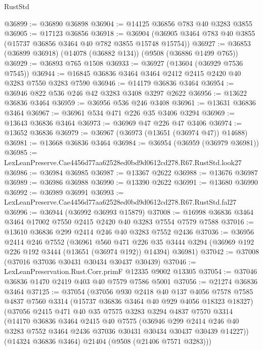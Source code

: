 \begin{lexlean}{RustStd}
\begin{coremodule}
@36899 := @36890 @36898
@36904 := @14125 @36856 @783 @40 @3283 @3855
@36905 := @17123 @36856
@36918 := @36904 (@36905 @3464 @783 @40 @3855 (@15737 @36856 @3464 @40 @782 @3855 @15748 @15754))
@36927 := @36853 (@36899 @36918) (@14078 (@36882 @134)) (@9508 (@36886 @1499 @765))
@36929 := @36893 @765 @1508
@36933 := @36927 (@13604 (@36929 @7536 @7545))
@36944 := @16845 @36836 @3464 @3464 @2412 @2415 @2420 @40 @3283 @7550 @3283 @7590
@36946 := @14179 @36836 @3464
@36954 := @36946 @822 @536 @246 @42 @3283 @3408 @3297 @2622
@36956 := @13622 @36836 @3464
@36959 := @36956 @536 @246 @3408
@36961 := @13631 @36836 @3464
@36967 := @36961 @534 @471 @226 @35 @3406 @3294
@36969 := @13643 @36836 @3464
@36973 := @36969 @47 @226 @47 @3406
@36974 := @13652 @36836
@36979 := @36967 (@36973 (@13651 (@36974 @47)) @14688)
@36981 := @13668 @36836 @3464
@36984 := @36954 (@36959 (@36979 @36981))
@36985 := LexLeanPreserve.Cae4456d77aa62528ed0bd9d0612cd278.R67.RustStd.look27
@36986 := @36984 @36985
@36987 := @13367 @2622
@36988 := @13676 @36987
@36989 := @36986 @36988
@36990 := @13390 @2622
@36991 := @13680 @36990
@36992 := @36989 @36991
@36993 := LexLeanPreserve.Cae4456d77aa62528ed0bd9d0612cd278.R67.RustStd.fal27
@36996 := @36944 (@36992 @36993 @15879)
@37008 := @16998 @36836 @3464 @3464 @17002 @7550 @2415 @2420 @40 @3283 @7554 @7579 @7588
@37016 := @13610 @36836 @299 @2414 @246 @40 @3283 @7552 @2436
@37036 := @36956
    @2414
    @246
    @7552
    (@36961
      @560
      @471
      @226
      @35
      @3444
      @3294
      (@36969 @192 @226 @192 @3444 (@13651 (@36974 @192)) @14394)
      @36981)
@37042 := @37008 (@37016 @37036 @30431 @30434 @30437 @30439)
@37046 := LexLeanPreservation.Rust.Corr.primF @12335 @9002 @13305
@37054 := @37046 @36836 @1470 @2419 @403 @40 @7579 @7586 @5001
@37056 := @21274 @36836 @3464
@37125 := @37054
    (@37056
      @930
      @2418
      @40
      @137
      @4056
      @7578
      @7585
      @4837
      @7560
      @3314
      (@15737 @36836 @3464 @40 @929 @4056 @18323 @18327)
      (@37056
        @2415
        @471
        @40
        @35
        @7575
        @3283
        @3294
        @4837
        @7570
        @3314
        (@14170
          @36836
          @3464
          @2415
          @40
          @7575
          (@36946
            @299
            @2414
            @246
            @40
            @3283
            @7552
            @3464
            @2436
            @37036
            @30431
            @30434
            @30437
            @30439
            @14227))
        (@14324 @36836 @3464)
        @21404
        (@9508 (@21406 @7571 @3283)))

\end{coremodule}
\end{lexlean}
